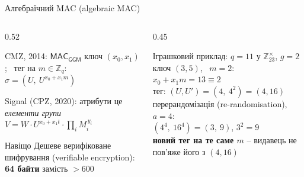 \documentclass[aspectratio=169, 10pt, xcolor=svgnames]{beamer}
\newcommand{\Zq}{\mathbb{Z}_q}
\begin{document}
\begin{frame}{Алгебраїчний MAC (algebraic MAC)}
  \begin{columns}[T]
    \begin{column}{0.52\textwidth}
      \begin{block}{CMZ, 2014\footnotemark[1]: $\mathsf{MAC}_{\mathsf{GGM}}$}
        ключ $(x_0,x_1)$; \ тег на $m\in\Zq$: \ $\sigma = (U,\ U^{x_0+x_1 m})$
      \end{block}
      \begin{block}{Signal (CPZ, 2020)\footnotemark[2]: атрибути це \emph{елементи групи}}
        $V = W \cdot U^{x_0+x_1 t}\cdot \prod_i M_i^{\,y_i}$
      \end{block}
      \begin{alertblock}{Навіщо}
        \small Дешеве верифіковане шифрування (verifiable encryption):\\ \textbf{64 байти} замість $>600$
      \end{alertblock}
    \end{column}
    \begin{column}{0.45\textwidth}
      \begin{exampleblock}{Іграшковий приклад: $q=11$ у $\mathbb{Z}_{23}^{\times}$, $g=2$}
        \small
        ключ $(3,5)$, \ $m=2$: \ $x_0+x_1m = 13 \equiv 2$\\[2pt]
        тег: $(U,U') = (4,\ 4^2) = (4,16)$\\[4pt]
        перерандомізація (re-randomisation), $a=4$:\\
        $(4^4,\ 16^4) = (3,\ 9)$, \quad $3^2 = 9$ \checkmark\\[4pt]
        \textbf{новий тег на те саме $m$} -- видавець не пов'яже його з $(4,16)$
      \end{exampleblock}
    \end{column}
  \end{columns}
\end{frame}

\end{document}
